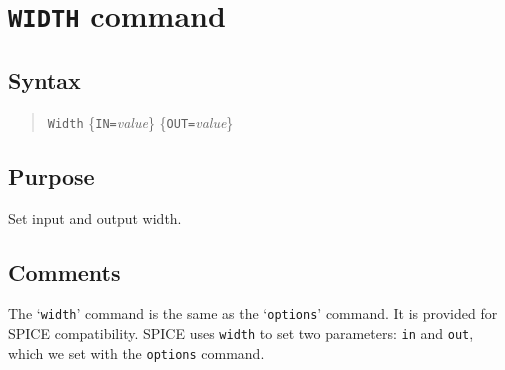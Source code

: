%
%
%
%
\section{{\tt WIDTH} command}
\subsection{Syntax}
\begin{verse}
{\tt Width} \{{\tt IN=}{\it value}\} \{{\tt OUT=}{\it value}\}
\end{verse}
\subsection{Purpose}

Set input and output width.
\subsection{Comments}

The `{\tt width}' command is the same as the `{\tt options}'
command.  It is provided for SPICE compatibility.  SPICE uses
{\tt width} to set two parameters: {\tt in} and {\tt out},
which we set with the {\tt options} command.
